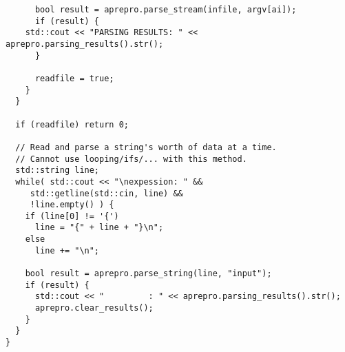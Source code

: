 \begin{lstlisting}
      bool result = aprepro.parse_stream(infile, argv[ai]);
      if (result) {
	std::cout << "PARSING RESULTS: " << aprepro.parsing_results().str();
      }

      readfile = true;
    }
  }

  if (readfile) return 0;

  // Read and parse a string's worth of data at a time.
  // Cannot use looping/ifs/... with this method.
  std::string line;
  while( std::cout << "\nexpession: " &&
	 std::getline(std::cin, line) &&
	 !line.empty() ) {
    if (line[0] != '{')
      line = "{" + line + "}\n";
    else
      line += "\n";

    bool result = aprepro.parse_string(line, "input");
    if (result) {
      std::cout << "         : " << aprepro.parsing_results().str();
      aprepro.clear_results();
    }
  }
}
\end{lstlisting}

